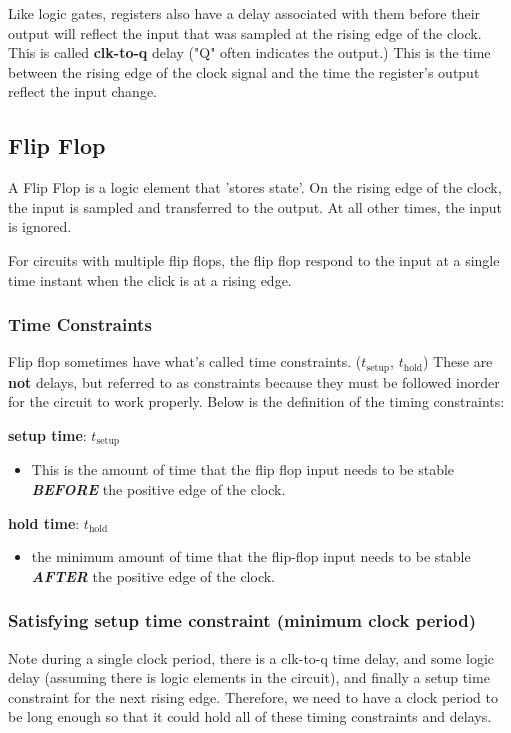 \documentclass[12pt]{article}
\begin{document}
Like logic gates, registers also have a delay associated with them before their output will reflect the input that was sampled at the rising edge of the clock. This is called \textbf{clk-to-q} delay ("Q" often indicates the output.) This is the time between the rising edge of the clock signal and the time the register's output reflect the input change.

\subsection*{Flip Flop}
A Flip Flop is a logic element that 'stores state'.
On the rising edge of the clock, the input is sampled and transferred to the output. At all other times, the input is ignored.

For circuits with multiple flip flops, the flip flop respond to the input at a single time instant when the click is at a rising edge.

\subsubsection*{Time Constraints}
Flip flop sometimes have what's called time constraints. ($t_{\text{setup}}$, $t_{\text{hold}}$) These are \textbf{not} delays, but referred to as constraints because they must be followed inorder for the circuit to work properly. Below is the definition of the timing constraints:

\textbf{setup time}: $t_{\text{setup}}$
\begin{itemize}
    \item This is the amount of time that the flip flop input needs to be stable \emph{\textbf{BEFORE}} the positive edge of the clock.
\end{itemize}


\textbf{hold time}: $t_{\text{hold}}$
\begin{itemize}
    \item the minimum amount of time that the flip-flop input needs to be stable \emph{\textbf{AFTER}} the positive edge of the clock.
\end{itemize}

\subsubsection*{Satisfying setup time constraint (minimum clock period)}
Note during a single clock period, there is a clk-to-q time delay, and some logic delay (assuming there is logic elements in the circuit), and finally a setup time constraint for the next rising edge. Therefore, we need to have a clock period to be long enough so that it could hold all of these timing constraints and delays.
\end{document}
